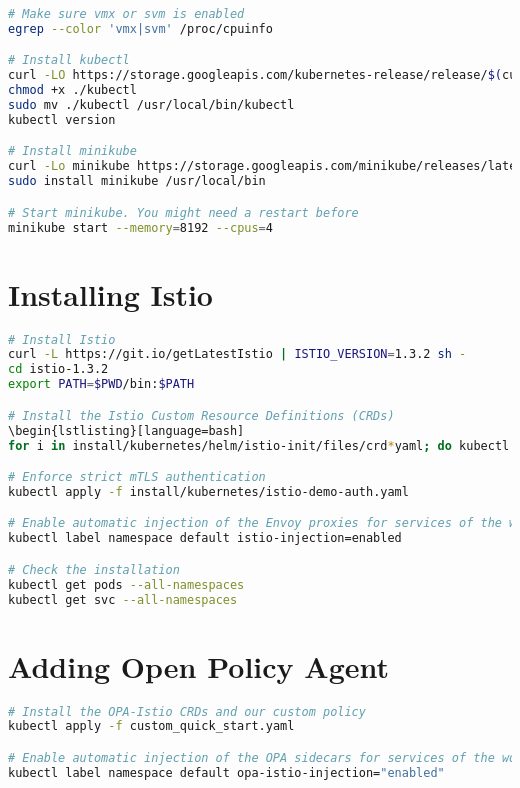 \documentclass[12pt]{article}
\begin{document}
\begin{lstlisting}[language=bash]
# Make sure vmx or svm is enabled
egrep --color 'vmx|svm' /proc/cpuinfo

# Install kubectl
curl -LO https://storage.googleapis.com/kubernetes-release/release/$(curl -s https://storage.googleapis.com/kubernetes-release/release/stable.txt)/bin/linux/amd64/kubectl
chmod +x ./kubectl
sudo mv ./kubectl /usr/local/bin/kubectl
kubectl version

# Install minikube
curl -Lo minikube https://storage.googleapis.com/minikube/releases/latest/minikube-linux-amd64 && chmod +x minikube
sudo install minikube /usr/local/bin

# Start minikube. You might need a restart before
minikube start --memory=8192 --cpus=4
\end{lstlisting}



\section{Installing Istio}

\begin{lstlisting}[language=bash]
# Install Istio
curl -L https://git.io/getLatestIstio | ISTIO_VERSION=1.3.2 sh -
cd istio-1.3.2
export PATH=$PWD/bin:$PATH

# Install the Istio Custom Resource Definitions (CRDs)
\begin{lstlisting}[language=bash]
for i in install/kubernetes/helm/istio-init/files/crd*yaml; do kubectl apply -f $i; done

# Enforce strict mTLS authentication
kubectl apply -f install/kubernetes/istio-demo-auth.yaml

# Enable automatic injection of the Envoy proxies for services of the workflow
kubectl label namespace default istio-injection=enabled

# Check the installation
kubectl get pods --all-namespaces
kubectl get svc --all-namespaces
\end{lstlisting}



\section{Adding Open Policy Agent}

\begin{lstlisting}[language=bash]
# Install the OPA-Istio CRDs and our custom policy
kubectl apply -f custom_quick_start.yaml

# Enable automatic injection of the OPA sidecars for services of the workflow
kubectl label namespace default opa-istio-injection="enabled"
\end{lstlisting}
\end{document}
